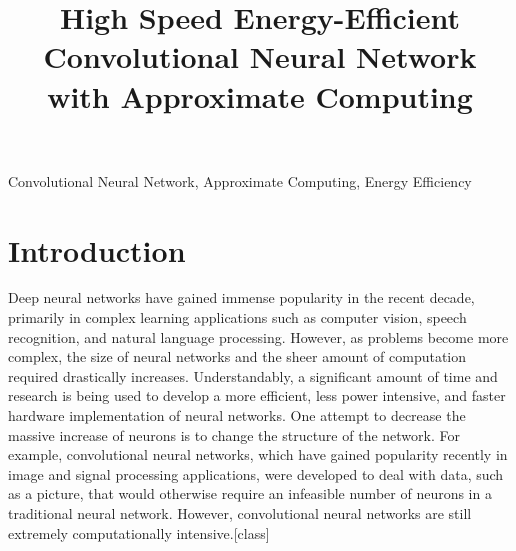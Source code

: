 \documentclass[conference]{IEEEtran}
\begin{document}
\title{High Speed Energy-Efficient Convolutional Neural Network with Approximate Computing}

\author{
\and
{}
}

\maketitle

\begin{abstract}
\blindtext[1]
\end{abstract}

\begin{IEEEkeywords}
Convolutional Neural Network, Approximate Computing, Energy Efficiency
\end{IEEEkeywords}

\IEEEpeerreviewmaketitle

\section{Introduction}
	\indent Deep neural networks have gained immense popularity in the recent decade, primarily in complex learning applications such as computer vision, speech recognition, and natural language processing. However, as problems become more complex, the size of neural networks and the sheer amount of computation required drastically increases. Understandably, a significant amount of time and research is being used to develop a more efficient, less power intensive, and faster hardware implementation of neural networks. One attempt to decrease the massive increase of neurons is to change the structure of the network. For example, convolutional neural networks, which have gained popularity recently in image and signal processing applications, were developed to deal with data, such as a picture, that would otherwise require an infeasible number of neurons in a traditional neural network. However, convolutional neural networks are still extremely computationally intensive.[class] \\
	
\end{document}
